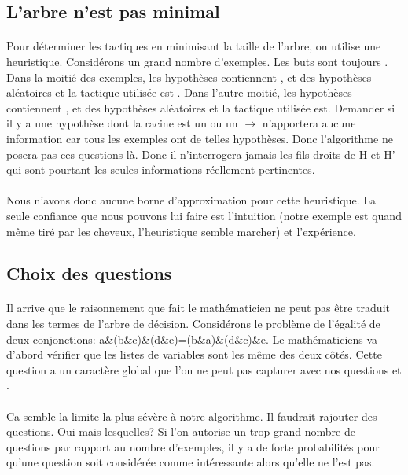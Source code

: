 \subsection*{L'arbre n'est pas minimal}
\paragraph{}Pour déterminer les tactiques en minimisant la taille de l'arbre, on utilise une heuristique. Considérons un grand nombre d'exemples. Les buts sont toujours . Dans la moitié des exemples, les hypothèses contiennent ,  et des hypothèses aléatoires et la tactique utilisée est . Dans l'autre moitié, les hypothèses contiennent ,  et des hypothèses aléatoires et la tactique utilisée est. Demander si il y a une hypothèse dont la racine est un \code{=} ou un $\rightarrow$ n'apportera aucune information car tous les exemples ont de telles hypothèses. Donc l'algorithme ne posera pas ces questions là. Donc il n'interrogera jamais les fils droits de H et H' qui sont pourtant les seules informations réellement pertinentes.

\paragraph{} Nous n'avons donc aucune borne d'approximation pour cette heuristique. La seule confiance que nous pouvons lui faire est l'intuition (notre exemple est quand même tiré par les cheveux, l'heuristique semble marcher) et l'expérience.

\subsection*{Choix des questions}
\paragraph{} Il arrive que le raisonnement que fait le mathématicien ne peut pas être traduit dans les termes de l'arbre de décision. Considérons le problème de l'égalité de deux conjonctions: a\&(b\&c)\&(d\&e)=(b\&a)\&(d\&c)\&e. Le mathématiciens va d'abord vérifier que les listes de variables sont les même des deux côtés. Cette question a un caractère global que l'on ne peut pas capturer avec nos questions  et .

\paragraph{} Ca semble la limite la plus sévère à notre algorithme. Il faudrait rajouter des questions. Oui mais lesquelles? Si l'on autorise un trop grand nombre de questions par rapport au nombre d'exemples, il y a de forte probabilités pour qu'une question soit considérée comme intéressante alors qu'elle ne l'est pas.


